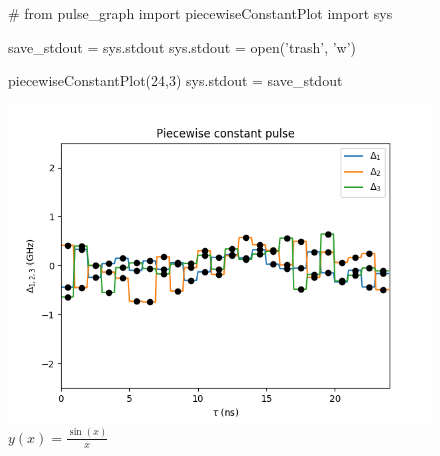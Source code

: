 \documentclass{article}
\begin{document}
\begin{figure}
\centering
\begin{python}
#
from pulse_graph import piecewiseConstantPlot
import sys


save_stdout = sys.stdout
sys.stdout = open('trash', 'w')

piecewiseConstantPlot(24,3)
sys.stdout = save_stdout
\end{python}
\includegraphics{T_24_pc.png}
\caption{$y(x)=\frac{\sin(x)}{x}$}
\end{figure}
\end{document}
